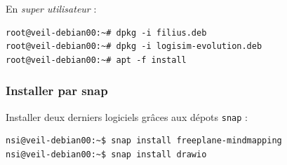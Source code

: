 \documentclass[11pt]{article}
\begin{document}
En \emph{super utilisateur} :

\begin{verbatim}
root@veil-debian00:~# dpkg -i filius.deb
root@veil-debian00:~# dpkg -i logisim-evolution.deb
root@veil-debian00:~# apt -f install
\end{verbatim}

    \hypertarget{installer-par-snap}{%
\subsubsection{Installer par snap}\label{installer-par-snap}}

    Installer deux derniers logiciels grâces aux dépots \texttt{snap} :

\begin{verbatim}
nsi@veil-debian00:~$ snap install freeplane-mindmapping
nsi@veil-debian00:~$ snap install drawio
\end{verbatim}


    
    
    
\end{document}
